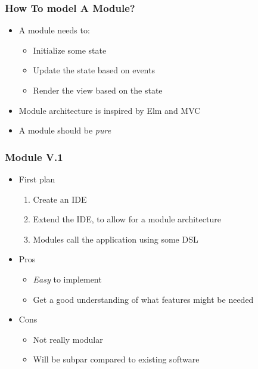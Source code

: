 \begin{frame}
  \frametitle{How To model A Module?}
  \begin{itemize}
    \item A module needs to:
      \begin{itemize}
        \item Initialize some state
        \item Update the state based on events
        \item Render the view based on the state
      \end{itemize}
    \item Module architecture is inspired by Elm and MVC
    \item A module should be \textit{pure}
  \end{itemize}
\end{frame}

\begin{frame}
  \frametitle{Module V.1}
  \begin{itemize}
    \item First plan
    \begin{enumerate}
      \item Create an IDE
      \item Extend the IDE, to allow for a module architecture
      \item Modules call the application using some DSL
    \end{enumerate}
    \item Pros
    \begin{itemize}
      \item \textit{Easy} to implement
      \item Get a good understanding of what features might be needed
    \end{itemize}
    \item Cons
    \begin{itemize}
      \item Not really modular
      \item Will be subpar compared to existing software
    \end{itemize}
  \end{itemize}
\end{frame}


